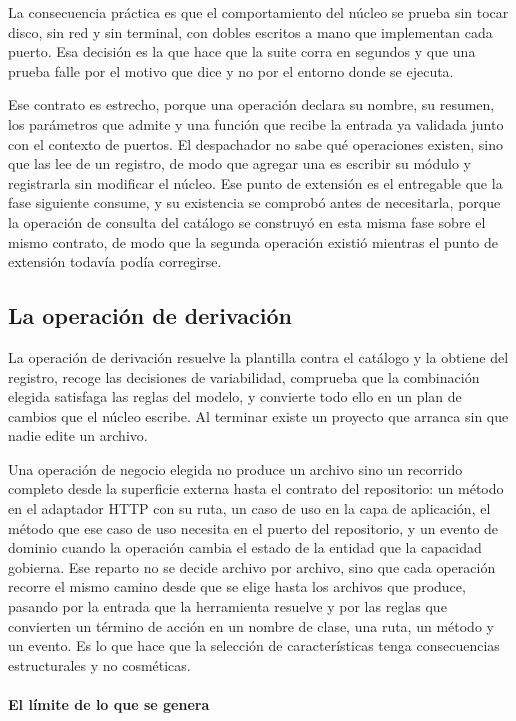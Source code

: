 La consecuencia práctica es que el comportamiento del núcleo se prueba sin
tocar disco, sin red y sin terminal, con dobles escritos a mano que
implementan cada puerto. Esa decisión es la que hace que la suite corra en
segundos y que una prueba falle por el motivo que dice y no por el entorno
donde se ejecuta.

Ese contrato es estrecho, porque una operación declara su nombre, su resumen,
los parámetros que admite y una función que recibe la entrada ya validada
junto con el contexto de puertos.
El despachador no sabe qué operaciones existen, sino que las lee de un
registro, de modo que agregar una es escribir su módulo y registrarla sin
modificar el núcleo. Ese punto de extensión es el entregable que la fase
siguiente consume, y su existencia se comprobó antes de necesitarla, porque la
operación de consulta del catálogo se construyó en esta misma fase sobre el
mismo contrato, de modo que la segunda operación existió mientras el punto de
extensión todavía podía corregirse.

\subsection{La operación de derivación}
\label{sec:comando-generacion}

La operación de derivación resuelve la plantilla contra el catálogo y la
obtiene del registro, recoge las decisiones de variabilidad, comprueba que la
combinación elegida satisfaga las reglas del modelo, y convierte todo ello en
un plan de cambios que el núcleo escribe. Al terminar existe un proyecto que
arranca sin que nadie edite un archivo.

Una operación de negocio elegida no produce un archivo sino un recorrido
completo desde la superficie externa hasta el contrato del repositorio: un
método en el adaptador HTTP con su ruta, un caso de uso en la capa de
aplicación, el método que ese caso de uso necesita en el puerto del
repositorio, y un evento de dominio cuando la operación cambia el estado de la
entidad que la capacidad gobierna. Ese reparto no se decide archivo por
archivo, sino que cada operación recorre el mismo camino desde que se elige
hasta los archivos que produce, pasando por la entrada que la herramienta
resuelve y por las reglas que convierten un término de acción en un nombre de
clase, una ruta, un método y un evento. Es lo que hace que la selección de
características tenga consecuencias estructurales y no cosméticas.

\paragraph*{El límite de lo que se genera}

